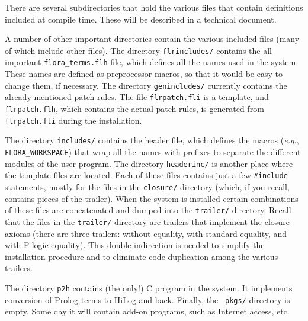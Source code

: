 \documentclass[11pt]{article}
\newcommand{\fl}{\mbox{F-logic}\xspace}
\begin{document}
There are several subdirectories that hold the various files that contain
definitions included at compile time. These will be described in a
technical document.

A number of other important directories contain the various included files
(many of which include other files). The directory {\tt flrincludes/}
contains the all-important {\tt flora\_terms.flh} file, which defines all
the names used in the system. These names are defined as preprocessor
macros, so that it would be easy to change them, if necessary.
The directory {\tt genincludes/} currently contains the already mentioned
patch rules. The file {\tt flrpatch.fli} is a template, and {\tt
  flrpatch.flh}, which contains the actual patch rules, is generated from
{\tt flrpatch.fli} during the installation.

The directory {\tt includes/} contains the header file, which defines the
macros ({\it e.g.}, {\tt FLORA\_WORKSPACE}) that wrap all the names with
prefixes to separate the different modules of the user program.  The
directory {\tt headerinc/} is another place where the template files are
located. Each of these files contains just a few {\tt \#include}
statements, mostly for the files in the {\tt closure/} directory (which, if
you recall, contains pieces of the trailer). When the system is installed
certain combinations of these files are concatenated and dumped into the
{\tt trailer/} directory. Recall that the files in the {\tt trailer/}
directory are trailers that implement the closure axioms (there are three
trailers: without equality, with standard equality, and with \fl equality).
This double-indirection is needed to simplify the installation procedure
and to eliminate code duplication among the various trailers.

The directory {\tt p2h} contains (the only!) C program in the system. It
implements conversion of Prolog terms to HiLog and back. Finally, the {\tt
  pkgs/} directory is empty. Some day it will contain add-on programs, such
as Internet access, etc.


\newpage



\printindex
\end{document}
